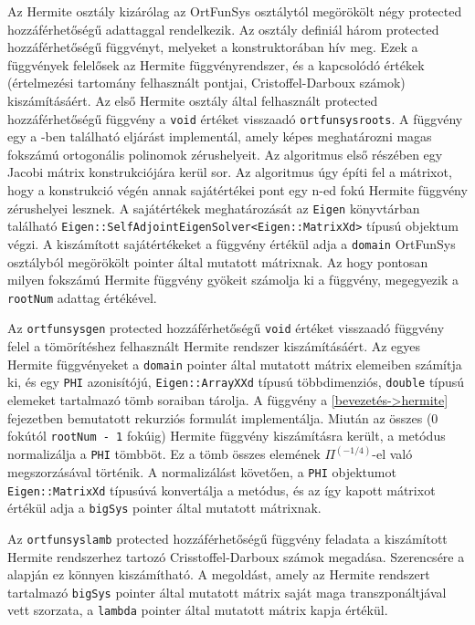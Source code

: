 \documentclass[oneside,titlepage,12pt,a4paper]{report}
\begin{document}
\par Az Hermite osztály kizárólag az OrtFunSys osztálytól megörökölt négy protected hozzáférhetőségű adattaggal rendelkezik. 
Az osztály definiál három protected hozzáférhetőségű függvényt, melyeket a konstruktorában hív meg. Ezek a függvények felelősek az Hermite függvényrendszer, és a kapcsolódó értékek (értelmezési tartomány felhasznált pontjai, Cristoffel-Darboux számok) kiszámításáért. 
Az első Hermite osztály által felhasznált protected hozzáférhetőségű függvény a \texttt{void} értéket visszaadó \texttt{ortfunsysroots}.
A függvény egy a \cite{Gautschi}-ben található eljárást implementál, amely képes meghatározni magas fokszámú ortogonális polinomok zérushelyeit. Az algoritmus első részében egy Jacobi mátrix konstrukciójára kerül sor. Az algoritmus úgy építi fel a mátrixot, hogy a konstrukció végén annak sajátértékei pont egy n-ed fokú Hermite függvény zérushelyei lesznek. A sajátértékek meghatározását az \texttt{Eigen} könyvtárban található \texttt{Eigen::SelfAdjointEigenSolver<Eigen::MatrixXd>} típusú objektum végzi. A kiszámított sajátértékeket a függvény értékül adja a \texttt{domain} OrtFunSys osztályból megörökölt pointer által mutatott mátrixnak. Az hogy pontosan milyen fokszámú Hermite függvény gyökeit számolja ki a függvény, megegyezik a \texttt{rootNum} adattag értékével.   
\par Az \texttt{ortfunsysgen} protected hozzáférhetőségű \texttt{void} értéket visszaadó függvény felel a tömörítéshez felhasznált Hermite rendszer kiszámításáért. Az egyes Hermite függvényeket a \texttt{domain} pointer által mutatott mátrix elemeiben számítja ki, és egy \texttt{PHI} azonisítójú, \texttt{Eigen::ArrayXXd} típusú többdimenziós, \texttt{double} típusú elemeket tartalmazó tömb soraiban tárolja. A függvény a \ref{bevezetés->hermite} fejezetben bemutatott rekurziós formulát implementálja. Miután az összes (0 fokútól \texttt{rootNum - 1} fokúig) Hermite függvény kiszámításra került, a metódus normalizálja a \texttt{PHI} tömbböt. Ez a tömb összes elemének $\Pi^{(-1/4)}$-el való megszorzásával történik. A normalizálást követően, a \texttt{PHI} objektumot \texttt{Eigen::MatrixXd} típusúvá konvertálja a metódus, és az így kapott mátrixot értékül adja a \texttt{bigSys} pointer által mutatott mátrixnak.
\par Az \texttt{ortfunsyslamb} protected hozzáférhetőségű függvény feladata a
kiszámított Hermite rendszerhez tartozó Crisstoffel-Darboux számok megadása. Szerencsére a \cite{kvadratúra formulás cikk} alapján ez könnyen kiszámítható. A megoldást, amely az Hermite rendszert tartalmazó \texttt{bigSys} pointer által mutatott mátrix saját maga transzponáltjával vett szorzata, a \texttt{lambda} pointer által mutatott mátrix kapja értékül. 
\end{document}
